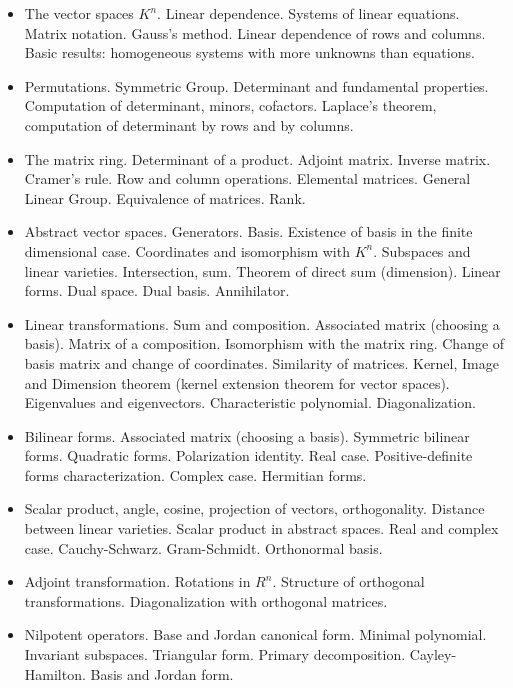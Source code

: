 \documentclass[spanish]{article}
\begin{document}
\begin{itemize}
  \item
The vector spaces $K^n$. Linear dependence. Systems of linear equations. Matrix
notation. Gauss's method. Linear dependence of rows and columns. Basic results:
homogeneous systems with more unknowns than equations.

  \item
Permutations. Symmetric Group. Determinant and fundamental properties. Computation
of determinant, minors, cofactors. Laplace's theorem, computation of determinant
by rows and by columns.

  \item
The matrix ring. Determinant of a product. Adjoint matrix. Inverse matrix. Cramer's rule.
Row and column operations. Elemental matrices. General Linear Group. Equivalence
of matrices. Rank.


  \item
Abstract vector spaces. Generators. Basis. Existence of basis in the finite dimensional case.
Coordinates and isomorphism with $K^n$. Subspaces and linear varieties. Intersection, sum.
Theorem of direct sum (dimension). Linear forms. Dual space. Dual basis. Annihilator.

  \item
Linear transformations. Sum and composition. Associated matrix (choosing a basis).
Matrix of a composition. Isomorphism with the matrix ring. Change of basis matrix
and change of coordinates. Similarity of matrices. Kernel, Image and Dimension theorem
(kernel extension theorem for vector spaces). Eigenvalues and eigenvectors. Characteristic
polynomial. Diagonalization.


  \item
Bilinear forms. Associated matrix (choosing a basis). Symmetric bilinear forms.
Quadratic forms. Polarization identity. Real case. Positive-definite forms characterization.
Complex case. Hermitian forms.


  \item
Scalar product, angle, cosine, projection of vectors, orthogonality. Distance between linear
varieties. Scalar product in abstract spaces. Real and complex case. Cauchy-Schwarz.
Gram-Schmidt. Orthonormal basis.

  \item
Adjoint transformation. Rotations in $R^n$. Structure of orthogonal transformations.
Diagonalization with orthogonal matrices.


  \item
Nilpotent operators. Base and Jordan canonical form. Minimal polynomial. Invariant subspaces.
Triangular form. Primary decomposition. Cayley-Hamilton. Basis and Jordan form.

\end{itemize}
\end{document}

